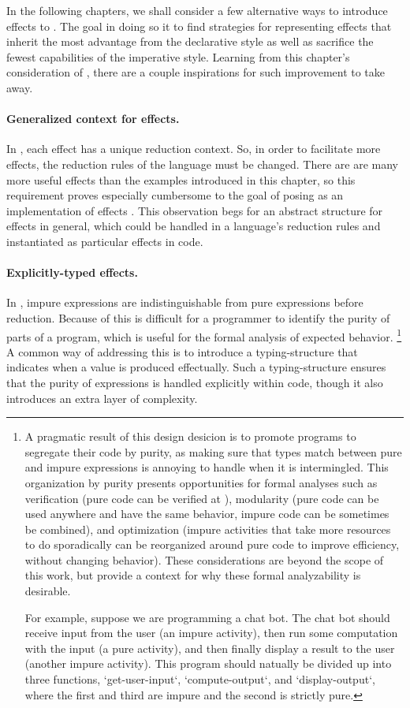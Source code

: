 In the following chapters, we shall consider a few alternative ways to introduce effects to \LangA.
The goal in doing so it to find strategies for representing effects that inherit the most advantage from the declarative style as well as sacrifice the fewest capabilities of the imperative style.
Learning from this chapter's consideration of \LangB, there are a couple inspirations for such improvement to take away.

\paragraph{Generalized context for effects.}
In \LangB, each effect has a unique reduction context.
So, in order to facilitate more effects, the reduction rules of the language must be changed.
There are are many more useful effects than the examples introduced in this chapter, so this requirement proves especially cumbersome to the goal of posing \LangB as an implementation of effects .
This observation begs for an abstract structure for effects in general, which could be handled in a language's reduction rules and instantiated as particular effects in code.

\paragraph{Explicitly-typed effects.}
In \LangB, impure expressions are indistinguishable from pure expressions before reduction.
Because of this is difficult for a programmer to identify the purity of parts of a program, which is useful for the formal analysis of expected behavior.%
\footnote{
  A pragmatic result of this design desicion is to promote programs to segregate their code by purity, as making sure that types match between pure and impure expressions is annoying to handle when it is intermingled.
  This organization by purity presents opportunities for formal analyses such as verification (pure code can be verified at ), modularity (pure code can be used anywhere and have the same behavior, impure code can be sometimes be combined), and optimization (impure activities that take more resources to do sporadically can be reorganized around pure code to improve efficiency, without changing behavior).
  These considerations are beyond the scope of this work, but provide a context for why these formal analyzability is desirable.

  For example, suppose we are programming a chat bot.
  The chat bot should receive input from the user (an impure activity),
  then run some computation with the input (a pure activity), and
  then finally display a result to the user (another impure activity).
  This program should natually be divided up into three functions, \code`get-user-input`, \code`compute-output`, and \code`display-output`, where the first and third are impure and the second is strictly pure.
}
A common way of addressing this is to introduce a typing-structure that indicates when a value is produced effectually.
Such a typing-structure ensures that the purity of expressions is handled explicitly within code, though it also introduces an extra layer of complexity.

